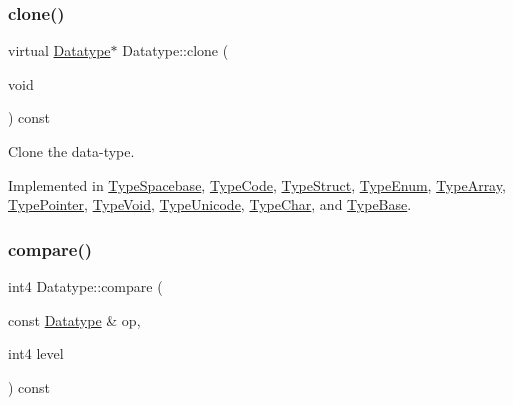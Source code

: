 \subsubsection{\texorpdfstring{clone()}{clone()}}
{\footnotesize\ttfamily virtual \mbox{\hyperlink{class_datatype}{Datatype}}$\ast$ Datatype\+::clone (\begin{DoxyParamCaption}\item[{void}]{ }\end{DoxyParamCaption}) const\hspace{0.3cm}{\ttfamily [pure virtual]}}



Clone the data-\/type. 



Implemented in \mbox{\hyperlink{class_type_spacebase_aefc6e8e08e15b87be40e987a916e85ec}{Type\+Spacebase}}, \mbox{\hyperlink{class_type_code_a450e2f5f2cd4a4573573da9a20e4d2fa}{Type\+Code}}, \mbox{\hyperlink{class_type_struct_a24e7e1af1cc231759cecf8445532f613}{Type\+Struct}}, \mbox{\hyperlink{class_type_enum_ac5592c52de3d1ccad25cd9e1e20126d7}{Type\+Enum}}, \mbox{\hyperlink{class_type_array_ad08c84ac6e8382fe9f930b4eacb275ce}{Type\+Array}}, \mbox{\hyperlink{class_type_pointer_acb36f99677bfbe269f7bfca663f81618}{Type\+Pointer}}, \mbox{\hyperlink{class_type_void_a4fe8a82cb4657566119e63b73164d22a}{Type\+Void}}, \mbox{\hyperlink{class_type_unicode_ab347e36debf5530b33cbfa2b329f9554}{Type\+Unicode}}, \mbox{\hyperlink{class_type_char_af09a0ae04e18990511b4f3bda2141559}{Type\+Char}}, and \mbox{\hyperlink{class_type_base_ad506116cf9bf5bc6d13654b38609d184}{Type\+Base}}.

\mbox{\label{class_datatype_a4d5a102b2d909180c3080fdb55d7b305}} 
\subsubsection{\texorpdfstring{compare()}{compare()}}
{\footnotesize\ttfamily int4 Datatype\+::compare (\begin{DoxyParamCaption}\item[{const \mbox{\hyperlink{class_datatype}{Datatype}} \&}]{op,  }\item[{int4}]{level }\end{DoxyParamCaption}) const\hspace{0.3cm}{\ttfamily [virtual]}}



